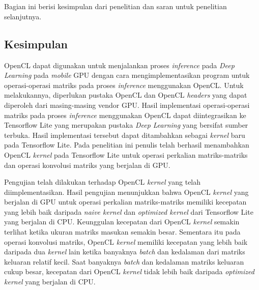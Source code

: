 \chapter{\babEnam}

Bagian ini berisi kesimpulan dari penelitian dan saran untuk penelitian selanjutnya.

\section{Kesimpulan}
OpenCL dapat digunakan untuk menjalankan proses \textit{inference} pada \textit{Deep Learning} pada \textit{mobile} GPU dengan cara mengimplementasikan program untuk operasi-operasi matriks pada proses \textit{inference} menggunakan OpenCL. Untuk melakukannya, diperlukan pustaka OpenCL dan OpenCL \textit{headers} yang dapat diperoleh dari masing-masing vendor GPU. Hasil implementasi operasi-operasi matriks pada proses \textit{inference} menggunakan OpenCL dapat diintegrasikan ke Tensorflow Lite yang merupakan pustaka \textit{Deep Learning} yang bersifat sumber terbuka. Hasil implementasi tersebut dapat ditambahkan sebagai \textit{kernel} baru pada Tensorflow Lite. Pada penelitian ini penulis telah berhasil menambahkan OpenCL \textit{kernel} pada Tensorflow Lite untuk operasi perkalian matriks-matriks dan operasi konvolusi matriks yang berjalan di GPU.

Pengujian telah dilakukan terhadap OpenCL \textit{kernel} yang telah diimplementasikan. Hasil pengujian menunjukkan bahwa OpenCL \textit{kernel} yang berjalan di GPU untuk operasi perkalian matriks-matriks memiliki kecepatan yang lebih baik daripada \textit{naive kernel} dan \textit{optimized kernel} dari Tensorflow Lite yang berjalan di CPU. Keunggulan kecepatan dari OpenCL \textit{kernel} semakin terlihat ketika ukuran matriks masukan semakin besar. Sementara itu pada operasi konvolusi matriks, OpenCL \textit{kernel} memiliki kecepatan yang lebih baik daripada dua \textit{kernel} lain ketika banyaknya \textit{batch} dan kedalaman dari matriks keluaran relatif kecil. Saat banyaknya \textit{batch} dan kedalaman matriks keluaran cukup besar, kecepatan dari OpenCL \textit{kernel} tidak lebih baik daripada \textit{optimized kernel} yang berjalan di CPU.


